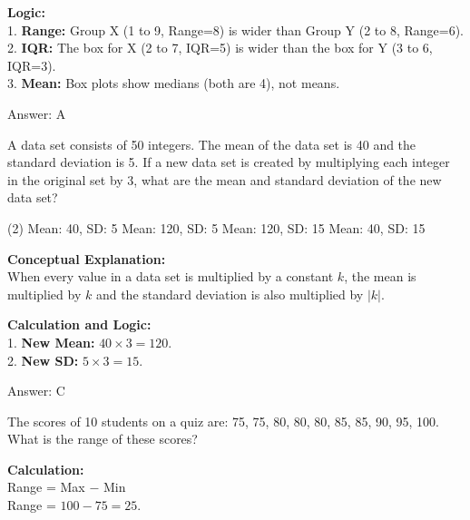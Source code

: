 \documentclass[11pt,paper=a4,answers]{exam}
\begin{document}
\begin{questions}
\begin{solution}
\textbf{Logic:} \\
1. \textbf{Range:} Group X (1 to 9, Range=8) is wider than Group Y (2 to 8, Range=6). \\
2. \textbf{IQR:} The box for X (2 to 7, IQR=5) is wider than the box for Y (3 to 6, IQR=3). \\
3. \textbf{Mean:} Box plots show medians (both are 4), not means.

\vspace{30pt}

Answer: \colorbox{yellow!100}{A}
\end{solution}

\question
A data set consists of 50 integers. The mean of the data set is 40 and the standard deviation is 5. If a new data set is created by multiplying each integer in the original set by 3, what are the mean and standard deviation of the new data set?
\begin{tasks}(2)
    \task Mean: 40, SD: 5
    \task Mean: 120, SD: 5
    \task Mean: 120, SD: 15
    \task Mean: 40, SD: 15
\end{tasks}

\begin{solution}
\textbf{Conceptual Explanation:} \\
When every value in a data set is multiplied by a constant $k$, the mean is multiplied by $k$ and the standard deviation is also multiplied by $|k|$.

\vspace{30pt}

\textbf{Calculation and Logic:} \\
1. \textbf{New Mean:} $40 \times 3 = 120$. \\
2. \textbf{New SD:} $5 \times 3 = 15$.

\vspace{30pt}

Answer: \colorbox{yellow!100}{C}
\end{solution}

\vspace{60pt}

\question
The scores of 10 students on a quiz are: 75, 75, 80, 80, 80, 85, 85, 90, 95, 100. What is the range of these scores?

\begin{solution}
\textbf{Calculation:} \\
Range = Max $-$ Min \\
Range = $100 - 75 = 25$.


\end{solution}
\end{questions}
\end{document}
